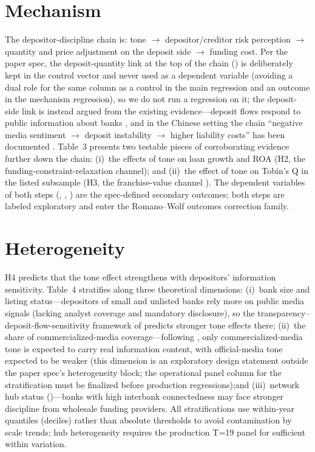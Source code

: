 \section{Mechanism}\label{sec:mech}

The depositor-discipline chain is: tone $\to$ depositor/creditor risk
perception $\to$ quantity and price adjustment on the deposit side
$\to$ funding cost. Per the paper spec, the deposit-quantity link at
the top of the chain () is deliberately kept in
the control vector and never used as a dependent variable (avoiding a
dual role for the same column as a control in the main regression and
an outcome in the mechanism regression), so we do not run a regression
on it; the deposit-side link is instead argued from the existing
evidence---deposit flows respond to public information about banks
\parencite{chen2022transparency}, and in the Chinese setting the chain
``negative media sentiment $\to$ deposit instability $\to$ higher
liability costs'' has been documented
\parencite{fang2024mediadeposit}. Table~3 presents two testable pieces
of corroborating evidence further down the chain: (i)~the effects of
tone on loan growth and ROA (H2, the funding-constraint-relaxation
channel); and (ii)~the effect of tone on Tobin's Q in the listed
subsample (H3, the franchise-value channel
\parencite{drechsler2026franchise}). The dependent variables of both
steps (, , ) are the
spec-defined secondary outcomes; both steps are labeled exploratory
and enter the Romano--Wolf outcomes correction family.

\section{Heterogeneity}\label{sec:het}

H4 predicts that the tone effect strengthens with depositors'
information sensitivity. Table~4 stratifies along three theoretical
dimensions: (i)~bank size and listing status---depositors of small and
unlisted banks rely more on public media signals (lacking analyst
coverage and mandatory disclosure), so the
transparency--deposit-flow-sensitivity framework of
\textcite{chen2022transparency} predicts stronger tone effects there;
(ii)~the share of commercialized-media coverage---following
\textcite{you2018pen}, only commercialized-media tone is expected to
carry real information content, with official-media tone expected to
be weaker (this dimension is an exploratory design statement outside
the paper spec's heterogeneity block; the operational panel column for
the stratification must be finalized before production regressions);and (iii)~network hub status ()---banks
with high interbank connectedness may face stronger discipline from
wholesale funding providers. All stratifications use within-year
quantiles (deciles) rather than absolute thresholds to avoid
contamination by scale trends; hub heterogeneity requires the
production T=19 panel for sufficient within variation.

